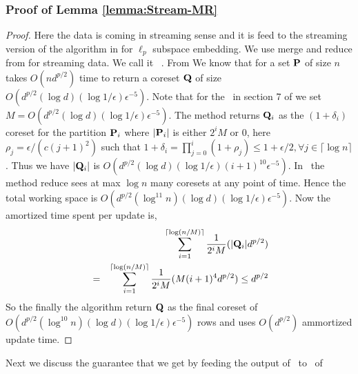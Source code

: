 \subsubsection{Proof of Lemma \ref{lemma:Stream-MR}}
\begin{proof}\label{proof:Stream-MR}
 Here the data is coming in streaming sense and it is feed to the streaming version of the algorithm in \cite{cohen2015p} for $\ell_{p}$ subspace embedding. We use merge and reduce from \cite{har2004coresets} for streaming data. We call it \mrlw~. From \cite{cohen2015p} We know that for a set $\mathbf{P}$ of size $n$ takes $O(nd^{p/2})$ time to return a coreset $\mathbf{Q}$ of size $O(d^{p/2}(\log d)(\log 1/\epsilon)\epsilon^{-5})$. Note that for the \mrlw~in section 7 of \cite{har2004coresets} we set $M=O(d^{p/2}(\log d)(\log 1/\epsilon)\epsilon^{-5})$. The method returns $\mathbf{Q}_{i}$ as the $(1 + \delta_{i})$ coreset for the partition $\mathbf{P}_{i}$ where $|\mathbf{P}_{i}|$ is either $2^{i}M$ or $0$, here $\rho_{j} = \epsilon/(c(j+1)^{2})$ such that $1+\delta_{i} = \prod_{j=0}^{i} (1 + \rho_{j}) \leq 1 + \epsilon/2, \forall j \in \lceil \log n \rceil$. Thus we have $|\mathbf{Q}_{i}|$ is $O(d^{p/2}(\log d)(\log 1/\epsilon)(i+1)^{10}\epsilon^{-5})$. In \mrlw~the method reduce sees at max $\log n$ many coresets at any point of time. Hence the total working space is $O(d^{p/2}(\log^{11} n)(\log d)(\log 1/\epsilon)\epsilon^{-5})$. Now the amortized time spent per update is,
 \begin{eqnarray*}
  && \sum_{i=1}^{\lceil \log (n/M) \rceil} \frac{1}{2^{i}M}(|\mathbf{Q}_{i}|d^{p/2}) \\
  &=& \sum_{i=1}^{\lceil \log (n/M) \rceil} \frac{1}{2^{i}M}(M(i+1)^{4}d^{p/2}) \leq d^{p/2}
 \end{eqnarray*}
So the finally the algorithm return $\mathbf{Q}$ as the final coreset of $O(d^{p/2}(\log^{10} n)(\log d)(\log 1/\epsilon)\epsilon^{-5})$ rows and uses $O(d^{p/2})$ ammortized update time.
\end{proof}
% 
Next we discuss the guarantee that we get by feeding the output of \online~to \mrlw~of \cite{cohen2015p}
